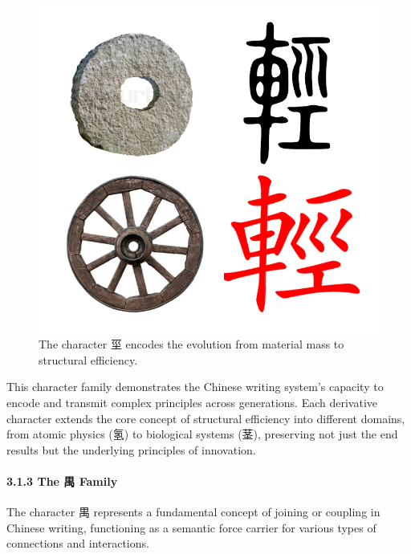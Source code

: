 \begin{figure}
\centering
\includegraphics{./images/zi_stem.png}
\caption{The character 坙 encodes the evolution from material mass to
structural efficiency.}
\end{figure}

This character family demonstrates the Chinese writing system's capacity
to encode and transmit complex principles across generations. Each
derivative character extends the core concept of structural efficiency
into different domains, from atomic physics (氢) to biological systems
(茎), preserving not just the end results but the underlying principles
of innovation.

\paragraph{3.1.3 The 禺 Family}\label{the-ux79ba-family}

The character 禺 represents a fundamental concept of joining or coupling
in Chinese writing, functioning as a semantic force carrier for various
types of connections and interactions.

